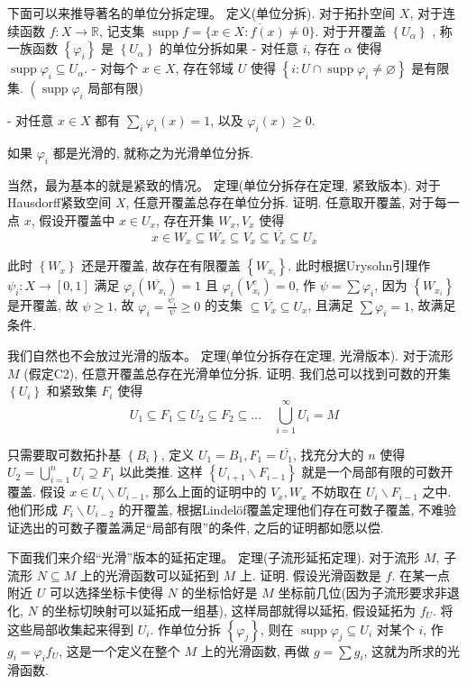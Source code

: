 \documentclass[options]{article}
\begin{document}
下面可以来推导著名的单位分拆定理。
定义(单位分拆). 对于拓扑空间 $X$, 对于连续函数 $f: X \rightarrow \mathbb{R}$, 记支集 $\operatorname{supp} f=\overline{\{x \in X: f(x) \neq 0\}}$. 对于开覆盖 $\left\{U_\alpha\right\}$ , 称一族函数 $\left\{\varphi_i\right\}$ 是 $\left\{U_\alpha\right\}$ 的单位分拆如果
- 对任意 $i$, 存在 $\alpha$ 使得 $\operatorname{supp} \varphi_i \subseteq U_\alpha$.
- 对每个 $x \in X$, 存在邻域 $U$ 使得 $\left\{i: U \cap \operatorname{supp} \varphi_i \neq \varnothing\right\}$ 是有限集. $\left(\operatorname{supp} \varphi_i\right.$ 局部有限)

- 对任意 $x \in X$ 都有 $\sum_i \varphi_i(x)=1$, 以及 $\varphi_i(x) \geq 0$.

如果 $\varphi_i$ 都是光滑的, 就称之为光滑单位分拆.

当然，最为基本的就是紧致的情况。
定理(单位分拆存在定理, 紧致版本). 对于Hausdorff紧致空间 $X$, 任意开覆盖总存在单位分拆.
证明. 任意取开覆盖, 对于每一点 $x$, 假设开覆盖中 $x \in U_x$, 存在开集 $W_x, V_x$ 使得
\[
x \in W_x \subseteq \overline{W_x} \subseteq V_x \subseteq \overline{V_x} \subseteq U_x
\]

此时 $\left\{W_x\right\}$ 还是开覆盖, 故存在有限覆盖 $\left\{W_{x_i}\right\}$. 此时根据Urysohn引理作 $\psi_i: X \rightarrow[0,1]$ 满足 $\varphi_i\left(\overline{W_{x_i}}\right)=1$ 且 $\varphi_i\left(V_{x_i}^c\right)=0$, 作 $\psi=\sum \varphi_i$, 因为 $\left\{W_{x_i}\right\}$ 是开覆盖, 故 $\psi \geq 1$, 故 $\varphi_i=\frac{\psi_i}{\psi} \geq 0$ 的支集 $\subseteq \overline{V_x} \subseteq U_x$, 且满足 $\sum \varphi_i=1$, 故满足条件.

我们自然也不会放过光滑的版本。
定理(单位分拆存在定理, 光滑版本). 对于流形 $M$ (假定C2), 任意开覆盖总存在光滑单位分拆.
证明. 我们总可以找到可数的开集 $\left\{U_i\right\}$ 和紧致集 $F_i$ 使得
\[
U_1 \subseteq F_1 \subseteq U_2 \subseteq F_2 \subseteq \ldots \quad \bigcup_{i=1}^{\infty} U_i=M
\]

只需要取可数拓扑基 $\left\{B_i\right\}$, 定义 $U_1=B_1, F_1=\overline{U_1}$, 找充分大的 $n$ 使得 $U_2=\bigcup_{i=1}^n U_i \supseteq F_1$ 以此类推. 这样 $\left\{U_{i+1} \backslash F_{i-1}\right\}$ 就是一个局部有限的可数开覆盖. 假设 $x \in U_i \backslash U_{i-1}$, 那么上面的证明中的 $V_x, W_x$ 不妨取在 $U_i \backslash F_{i-1}$ 之中. 他们形成 $F_i \backslash U_{i-2}$ 的开覆盖, 根据Lindelöf覆盖定理他们存在可数子覆盖, 不难验证选出的可数子覆盖满足“局部有限”的条件, 之后的证明都如愿以偿.

下面我们来介绍“光滑”版本的延拓定理。
定理(子流形延拓定理). 对于流形 $M$, 子流形 $N \subseteq M$ 上的光滑函数可以延拓到 $M$ 上.
证明. 假设光滑函数是 $f$. 在某一点附近 $U$ 可以选择坐标卡使得 $N$ 的坐标恰好是 $M$ 坐标前几位(因为子流形要求非退化, $N$ 的坐标切映射可以延拓成一组基), 这样局部就得以延拓, 假设延拓为 $f_U$. 将这些局部收集起来得到 $U_i$. 作单位分拆 $\left\{\varphi_j\right\}$, 则在 $\operatorname{supp} \varphi_j \subseteq U_i$ 对某个 $i$, 作 $g_i=\varphi_i f_U$, 这是一个定义在整个 $M$ 上的光滑函数, 再做 $g=\sum g_i$, 这就为所求的光滑函数.
\end{document}
